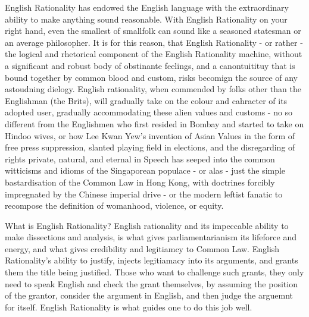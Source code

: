 \separator
English Rationality has endowed the English language with the extraordinary ability to make anything sound reasonable. With English Rationality on your right hand, even the smallest of smallfolk can sound like a seasoned statesman or an average philosopher. It is for this reason, that English Rationality - or rather - the logical and rhetorical component of the English Rationality machine, without a significant and robust body of obstinante feelings, and a canontuitituy that is bound together by common blood and custom, risks becomign the source of any astoudning dielogy. English rationality, when commended by folks other than the Englishman (the Brits), will gradually take on the colour and cahracter of its adopted user, gradually accommodating these alien values and customs - no so different from the Englishmen who first resided in Bombay and started to take on Hindoo wives, or how Lee Kwan Yew's invention of Asian Values in the form of free press suppression, slanted playing field in elections, and the disregarding of rights private, natural, and eternal in Speech has seeped into the common witticisms and idioms of the Singaporean populace - or alas - just the simple bastardisation of the Common Law in Hong Kong, with doctrines forcibly impregnated by the Chinese imperial drive - or the modern leftist fanatic to recompose the definition of womanhood, violence, or equity.


\separator

What is English Rationality? English rationality and its impeccable ability to make dissections and analysis, is what gives parliamentarianism its lifeforce and energy, and what gives credibility and legitiamcy to Common Law. English Rationality's ability to justify, injects legitiamacy into its arguments, and grants them the title being justified. Those who want to challenge such grants, they only need to speak English and check the grant themselves, by assuming the position of the grantor, consider the argument in English, and then judge the arguemnt for itself. English Rationality is what guides one to do this job well.